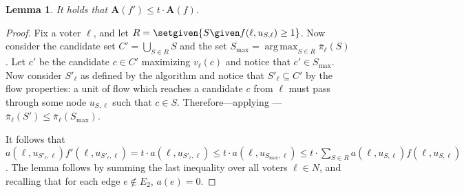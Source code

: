 \documentclass[letterpaper]{article} %
\DeclareMathOperator*{\argmax}{arg\,max}
\newtheorem{lemma}{Lemma}
\newcommand{\vecc}{\mathbf}
\newcommand{\Aoper}[1]{\vecc{A}({#1})}
\begin{document}
\begin{lemma} \label{totalPriceLemma}
It holds that $\Aoper{f'} \leq t \cdot \Aoper{f}$.
\end{lemma}
\begin{proof}
Fix a voter $\ell$, and let $R=\setgiven{S \given  f(\ell, u_{S, \ell})\geq 1}$. Now consider the candidate set $C' = \bigcup_{S \in R}S$ and the set $S_{\max}=\argmax_{S\in R} \bar{\pi}_{\ell}(S)$. Let $c'$ be the candidate $c \in C'$ maximizing $v_\ell(c)$ and notice that $c' \in S_{\max}$. Now consider $S'_{\ell}$ as defined by the algorithm and notice that $S'_{\ell} \subseteq C'$ by the flow properties: a unit of flow which reaches a candidate $c$ from $\ell$ must pass through some node $u_{S,\ell}$ such that $c \in S$. Therefore---applying ---$\bar{\pi}_{\ell}(S') \leq \bar{\pi}_{\ell}(S_{\max})$.

It follows that $a(\ell, u_{S'_\ell, \ell})f'(\ell, u_{S'_\ell, \ell}) =t \cdot a(\ell, u_{S'_\ell, \ell})  \leq t\cdot  a(\ell, u_{S_{\max}, \ell}) \leq 
t\cdot \sum_{S \in R}a(\ell, u_{S, \ell}) f(\ell, u_{S, \ell})$.
The lemma follows by summing the last inequality over all voters $\ell \in N$, and recalling that for each edge $e \notin E_2$, $a(e)=0$.
\end{proof}
\end{document}
